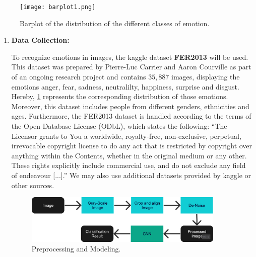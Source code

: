 \begin{figure}[h!]
\centering
\texttt{[image: barplot1.png]}
\caption{Barplot of the distribution of the different classes of emotion.}\label{fig:emo-distribution}
\end{figure}

\begin{enumerate}
\item \textbf{Data Collection:} %

To recognize emotions in images, the kaggle dataset \textbf{FER2013} \cite{FER2013} will be used. This dataset was prepared by Pierre-Luc Carrier and Aaron Courville as part of an ongoing research project and contains $35,887$ images, displaying the emotions anger, fear, sadness, neutralilty, happiness, surprise and disgust. Hereby, \ref{fig:emo-distribution} represents the corresponding distribution of those emotions. Moreover, this dataset includes people from different genders, ethnicities and ages. Furthermore, the FER2013 dataset is handled according to the terms of the Open Database License (ODbL), which states the following: ``The Licensor grants to You a worldwide, royalty-free, non-exclusive, perpetual, irrevocable copyright license to do any act that is restricted by copyright over anything within the Contents, whether in the original medium or any other. These rights explicitly include commercial use, and do not exclude any field of endeavour [...].'' \cite{odbl} We may also use additional datasets provided by kaggle or other sources.

\begin{figure}[h]
\centering
\includegraphics[width=0.9\textwidth]{images/fer-preprocessing-modelling.png}
\caption{Preprocessing and Modeling.}\label{fig:prep-mod}
\end{figure}


\end{enumerate}
